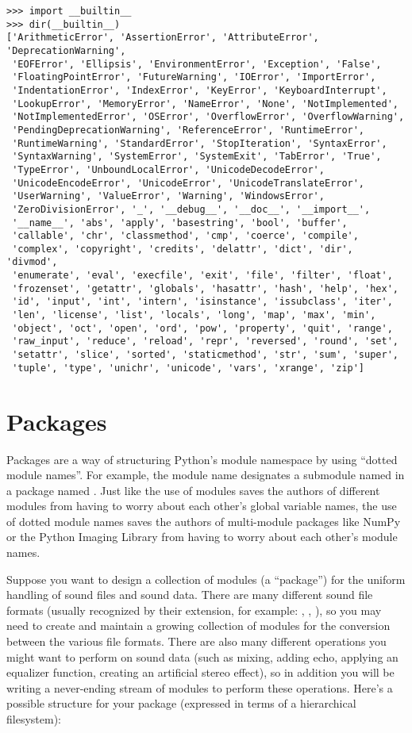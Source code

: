 \documentclass{manual}
\begin{document}
\begin{verbatim}
>>> import __builtin__
>>> dir(__builtin__)
['ArithmeticError', 'AssertionError', 'AttributeError', 'DeprecationWarning',
 'EOFError', 'Ellipsis', 'EnvironmentError', 'Exception', 'False',
 'FloatingPointError', 'FutureWarning', 'IOError', 'ImportError',
 'IndentationError', 'IndexError', 'KeyError', 'KeyboardInterrupt',
 'LookupError', 'MemoryError', 'NameError', 'None', 'NotImplemented',
 'NotImplementedError', 'OSError', 'OverflowError', 'OverflowWarning',
 'PendingDeprecationWarning', 'ReferenceError', 'RuntimeError',
 'RuntimeWarning', 'StandardError', 'StopIteration', 'SyntaxError',
 'SyntaxWarning', 'SystemError', 'SystemExit', 'TabError', 'True',
 'TypeError', 'UnboundLocalError', 'UnicodeDecodeError',
 'UnicodeEncodeError', 'UnicodeError', 'UnicodeTranslateError',
 'UserWarning', 'ValueError', 'Warning', 'WindowsError',
 'ZeroDivisionError', '_', '__debug__', '__doc__', '__import__',
 '__name__', 'abs', 'apply', 'basestring', 'bool', 'buffer',
 'callable', 'chr', 'classmethod', 'cmp', 'coerce', 'compile',
 'complex', 'copyright', 'credits', 'delattr', 'dict', 'dir', 'divmod',
 'enumerate', 'eval', 'execfile', 'exit', 'file', 'filter', 'float',
 'frozenset', 'getattr', 'globals', 'hasattr', 'hash', 'help', 'hex',
 'id', 'input', 'int', 'intern', 'isinstance', 'issubclass', 'iter',
 'len', 'license', 'list', 'locals', 'long', 'map', 'max', 'min',
 'object', 'oct', 'open', 'ord', 'pow', 'property', 'quit', 'range',
 'raw_input', 'reduce', 'reload', 'repr', 'reversed', 'round', 'set',
 'setattr', 'slice', 'sorted', 'staticmethod', 'str', 'sum', 'super',
 'tuple', 'type', 'unichr', 'unicode', 'vars', 'xrange', 'zip']
\end{verbatim}


\section{Packages \label{packages}}

Packages are a way of structuring Python's module namespace
by using ``dotted module names''.  For example, the module name
 designates a submodule named  in a package named
.  Just like the use of modules saves the authors of different
modules from having to worry about each other's global variable names,
the use of dotted module names saves the authors of multi-module
packages like NumPy or the Python Imaging Library from having to worry
about each other's module names.

Suppose you want to design a collection of modules (a ``package'') for
the uniform handling of sound files and sound data.  There are many
different sound file formats (usually recognized by their extension,
for example: , , ), so you may need
to create and maintain a growing collection of modules for the
conversion between the various file formats.  There are also many
different operations you might want to perform on sound data (such as
mixing, adding echo, applying an equalizer function, creating an
artificial stereo effect), so in addition you will be writing a
never-ending stream of modules to perform these operations.  Here's a
possible structure for your package (expressed in terms of a
hierarchical filesystem):
\end{document}

